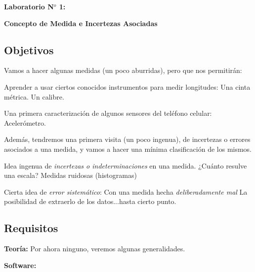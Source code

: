 \documentclass[10pt,a4paper]{article}
\numberwithin{equation}{section}%
\numberwithin{equation}{subsection}
\begin{document}
\begin{center}
{
\begin{large}
\vspace*{-1.2cm}
\textbf{Laboratorio N$^o$ 1:} \\
\end{large}
\begin{Large}
 \textbf{Concepto de Medida e Incertezas Asociadas}
\vspace*{-0.2cm}
\end{Large}
}
\end{center}
\subsection*{Objetivos}

Vamos a hacer algunas medidas (un poco aburridas), pero que nos permitirán:

\begin{outline}[enumerate]
\1 Aprender a usar ciertos conocidos instrumentos para medir longitudes:
	\2 Una cinta métrica.
	\2 Un calibre.
	
\1 Una primera caracterización de algunos sensores del teléfono celular:
	\2 Acelerómetro.
	
\end{outline}

Además, tendremos una primera visita (un poco ingenua), de incertezas o errores asociados a una medida, y vamos a hacer una mínima clasificación de los mismos.

\begin{outline}[enumerate]
\1 Idea ingenua de \textit{incertezas o indeterminaciones} en una medida.
	\2 ¿Cuánto resulve una escala?		
	\2 Medidas ruidosas (histogramas)

\1 Cierta idea de \textit{error sistemático}:
	\2 Con una medida hecha \textit{deliberadamente mal}
	\2 La posibilidad de extraerlo de los datos...hasta cierto punto.
	
	
\end{outline}

\subsection*{Requisitos}

\noindent \textbf{Teoría:} Por ahora ninguno, veremos algunas generalidades. 

\noindent \textbf{Software:} 
\end{document}
